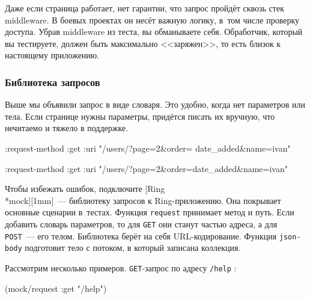 Даже если страница работает, нет гарантии, что запрос пройдёт сквозь стек
middleware. В боевых проектах он несёт важную логику, в~том числе проверку
доступа. Убрав middleware из теста, вы обманываете себя. Обработчик, который вы
тестируете, должен быть максимально <<заряжен>>, то есть близок к настоящему
приложению.

\subsubsection*{Библиотека запросов}

Выше мы объявили запрос в виде словаря. Это удобно, когда нет параметров или
тела. Если странице нужны параметры, придётся писать их вручную, что нечитаемо и
тяжело в поддержке.

\ifx\devicetype\mobile

\begin{english}
  \begin{clojure}
{:request-method :get
 :uri
 "/users/?page=2&order=
                 date_added&name=ivan"}
  \end{clojure}
\end{english}

\else

\begin{english}
  \begin{clojure}
{:request-method :get
 :uri "/users/?page=2&order=date_added&name=ivan"}
  \end{clojure}
\end{english}

\fi


Чтобы избежать ошибок, подключите
[Ring\\*mock][1mm]~--- библиотеку
запросов к Ring-приложению. Она покрывает основные сценарии в~тестах. Функция
\verb|request| принимает метод и путь. Если добавить словарь параметров, то
для \verb|GET| они станут частью адреса, а для \verb|POST|~--- его
телом. Библиотека берёт на себя URL-кодирование. Функция \verb|json-body|
подготовит тело с потоком, в который записана коллекция.

Рассмотрим несколько примеров. \verb|GET|-запрос по адресу \verb|/help| :

\begin{english}
  \begin{clojure}
(mock/request :get "/help")
  \end{clojure}
\end{english}

